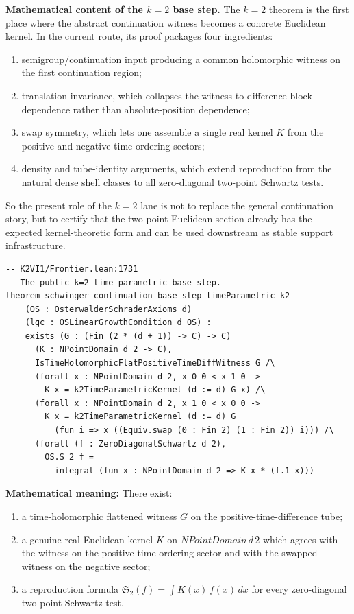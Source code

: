 \documentclass[11pt,a4paper]{article}
\begin{document}
\medskip\noindent
\textbf{Mathematical content of the \(k=2\) base step.}
The \(k=2\) theorem is the first place where the abstract continuation witness
becomes a concrete Euclidean kernel. In the current route, its proof packages
four ingredients:
\begin{enumerate}
\item semigroup/continuation input producing a common holomorphic witness on the
  first continuation region;
\item translation invariance, which collapses the witness to difference-block
  dependence rather than absolute-position dependence;
\item swap symmetry, which lets one assemble a single real kernel \(K\) from
  the positive and negative time-ordering sectors;
\item density and tube-identity arguments, which extend reproduction from the
  natural dense shell classes to all zero-diagonal two-point Schwartz tests.
\end{enumerate}
So the present role of the \(k=2\) lane is not to replace the general
continuation story, but to certify that the two-point Euclidean section already
has the expected kernel-theoretic form and can be used downstream as stable
support infrastructure.

\begin{lstlisting}
-- K2VI1/Frontier.lean:1731
-- The public k=2 time-parametric base step.
theorem schwinger_continuation_base_step_timeParametric_k2
    (OS : OsterwalderSchraderAxioms d)
    (lgc : OSLinearGrowthCondition d OS) :
    exists (G : (Fin (2 * (d + 1)) -> C) -> C)
      (K : NPointDomain d 2 -> C),
      IsTimeHolomorphicFlatPositiveTimeDiffWitness G /\
      (forall x : NPointDomain d 2, x 0 0 < x 1 0 ->
        K x = k2TimeParametricKernel (d := d) G x) /\
      (forall x : NPointDomain d 2, x 1 0 < x 0 0 ->
        K x = k2TimeParametricKernel (d := d) G
          (fun i => x ((Equiv.swap (0 : Fin 2) (1 : Fin 2)) i))) /\
      (forall (f : ZeroDiagonalSchwartz d 2),
        OS.S 2 f =
          integral (fun x : NPointDomain d 2 => K x * (f.1 x)))
\end{lstlisting}

\noindent\textbf{Mathematical meaning:} There exist:
\begin{enumerate}
\item a time-holomorphic flattened witness $G$ on the positive-time-difference
  tube;
\item a genuine real Euclidean kernel $K$ on $NPointDomain\, d\, 2$ which agrees
  with the witness on the positive time-ordering sector and with the swapped
  witness on the negative sector;
\item a reproduction formula
  $\mathfrak{S}_2(f) = \int K(x)\, f(x)\, dx$
  for every zero-diagonal two-point Schwartz test.
\end{enumerate}
\end{document}
